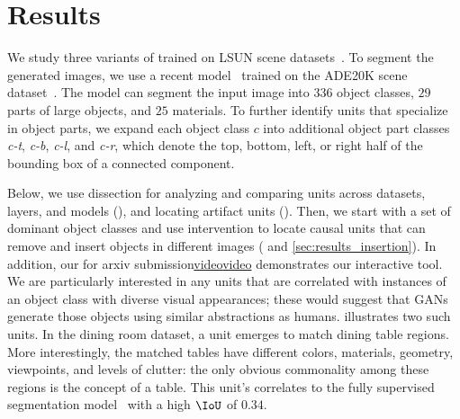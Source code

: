 \documentclass{article} %
\def\arxiv{for arxiv submission}
\begin{document}
\section{Results}
We study three variants of \pgan\citep{karras2018progressive} trained on LSUN scene datasets~\citep{yu2015lsun}. To segment the generated images, we use a recent model~\citep{xiao2018unified} trained on the ADE20K scene dataset~\citep{zhou2017scene}. The model can segment the input image into $336$ object classes, $29$  parts of large objects, and $25$ materials. 
To further identify units that specialize in object parts, we expand each object class $c$  into additional object part classes \textit{c-t}, \textit{c-b}, \textit{c-l}, and \textit{c-r}, which denote the top, bottom, left, or right half of the bounding box of a connected component.

Below, we use dissection for analyzing and comparing units across datasets, layers, and models (), and locating artifact units (). Then, we start with a set of dominant object classes and use intervention to locate causal units that can remove and insert objects in different images ( and \ref{sec:results_insertion}). In addition, our
\ifdefined\arxiv\href{http://tiny.cc/gandissect}{video}\else\href{http://tiny.cc/iclrganvis}{video}\fi
demonstrates our interactive tool. %
We are particularly interested in any units that are correlated with instances of an object class with diverse visual appearances; these would suggest that GANs generate those objects using similar abstractions as humans.   illustrates two such units.  In the dining room dataset, a unit emerges to match dining table regions. More interestingly, the matched tables have different colors, materials, geometry, viewpoints, and levels of clutter: the only obvious commonality among these regions is the concept of a table. %
This unit's \featuremap correlates to the fully supervised segmentation model~\citep{xiao2018unified} with a high $\IoU$ of $0.34$.
\end{document}
